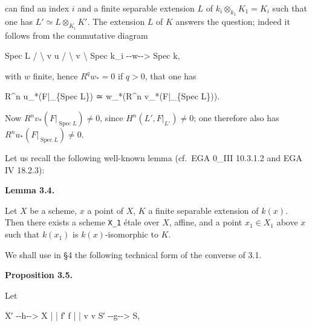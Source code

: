 \documentclass[
]{article}
\newenvironment{Shaded}{}{}
\newcommand{\NormalTok}[1]{#1}
\begin{document}
can find an index \(i\) and a finite separable extension \(L\) of
\(k_{i} \otimes_{k_{1}} K_{1} = K_{i}\) such that one has
\(L' \simeq L \otimes_{K_{i}} K'\). The extension \(L\) of \(K\) answers
the question; indeed it follows from the commutative diagram

\begin{Shaded}
\begin{Highlighting}[]
\NormalTok{        Spec L}
\NormalTok{       /     \textbackslash{}}
\NormalTok{      v       u}
\NormalTok{     /         \textbackslash{}}
\NormalTok{    v           \textbackslash{}}
\NormalTok{Spec k\_i {-}{-}w{-}{-}\textgreater{} Spec k,}
\end{Highlighting}
\end{Shaded}

with \(w\) finite, hence \(R^{q} w_{*} = 0\) if \(q > 0\), that one has

\begin{Shaded}
\begin{Highlighting}[]
\NormalTok{R\^{}n u\_*(F|\_\{Spec L\}) ≃ w\_*(R\^{}n v\_*(F|\_\{Spec L\})).}
\end{Highlighting}
\end{Shaded}

Now \(R^{n} v_{*}(F|_{\operatorname{Spec} L}) \neq 0\), since
\(H^{n}(L', F|_{L'}) \neq 0\); one therefore also has
\(R^{n} u_{*}(F|_{\operatorname{Spec} L}) \neq 0\).

Let us recall the following well-known lemma (cf.~EGA 0\_III 10.3.1.2
and EGA IV 18.2.3):

\textbf{Lemma 3.4.}

Let \(X\) be a scheme, \(x\) a point of \(X\), \(K\) a finite separable
extension of \(k(x)\). Then there exists a scheme \texttt{X\_1} étale
over \(X\), affine, and a point \(x_{1} \in X_{1}\) above \(x\) such
that \(k(x_{1})\) is \(k(x)\)-isomorphic to \(K\).

We shall use in §4 the following technical form of the converse of 3.1.

\textbf{Proposition 3.5.}

Let

\begin{Shaded}
\begin{Highlighting}[]
\NormalTok{X′ {-}{-}h{-}{-}\textgreater{} X}
\NormalTok{|         |}
\NormalTok{f′        f}
\NormalTok{|         |}
\NormalTok{v         v}
\NormalTok{S′ {-}{-}g{-}{-}\textgreater{} S,}
\end{Highlighting}
\end{Shaded}
\end{document}
